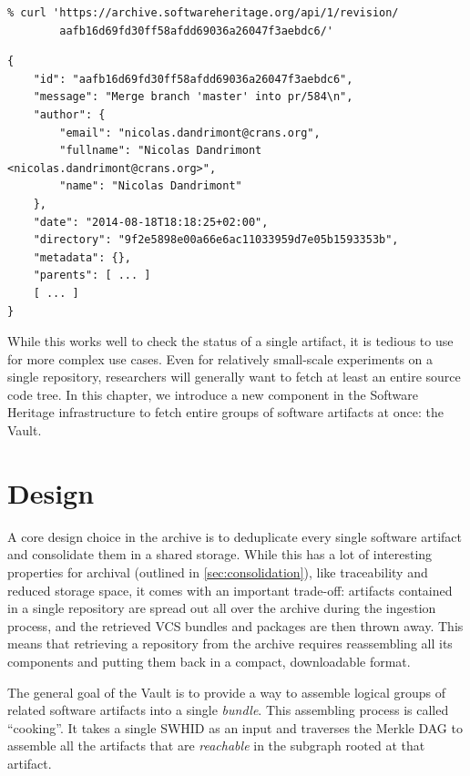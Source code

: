\begin{minipage}{0.96\textwidth}
\begin{verbatim}
% curl 'https://archive.softwareheritage.org/api/1/revision/
        aafb16d69fd30ff58afdd69036a26047f3aebdc6/'
\end{verbatim}
\begin{verbatim}
{
    "id": "aafb16d69fd30ff58afdd69036a26047f3aebdc6",
    "message": "Merge branch 'master' into pr/584\n",
    "author": {
        "email": "nicolas.dandrimont@crans.org",
        "fullname": "Nicolas Dandrimont <nicolas.dandrimont@crans.org>",
        "name": "Nicolas Dandrimont"
    },
    "date": "2014-08-18T18:18:25+02:00",
    "directory": "9f2e5898e00a66e6ac11033959d7e05b1593353b",
    "metadata": {},
    "parents": [ ... ]
    [ ... ]
}
\end{verbatim}
\end{minipage}

\vspace{1em}

While this works well to check the status of a single artifact, it is tedious
to use for more complex use cases. Even for relatively small-scale experiments
on a single repository, researchers will generally want to fetch at least an
entire source code tree.  In this chapter, we introduce a new component in the
Software Heritage infrastructure to fetch entire groups of software artifacts
at once: the Vault.

\section{Design}

A core design choice in the \SWH{} archive is to deduplicate every single
software artifact and consolidate them in a shared storage. While this has a
lot of interesting properties for archival (outlined in
\cref{sec:consolidation}), like traceability and reduced storage space, it
comes with an important trade-off: artifacts contained in a single repository
are spread out all over the archive during the ingestion process, and the
retrieved \gls{VCS} bundles and packages are then thrown away. This means that
retrieving a repository from the archive requires reassembling all its
components and putting them back in a compact, downloadable format.

The general goal of the Vault is to provide a way to assemble logical groups of
related software artifacts into a single \emph{bundle}. This assembling process
is called ``cooking''. It takes a single \gls{SWHID} as an input and traverses
the Merkle DAG to assemble all the artifacts that are \emph{reachable} in the
subgraph rooted at that artifact.

